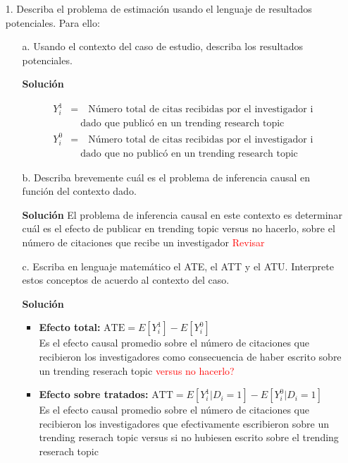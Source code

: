 \documentclass[a4paper, answers, addpoints, 11pt]{exam}
\begin{document}
\bigskip
\begin{itemize}
    \item[1.] Describa el problema de estimación usando el lenguaje de resultados potenciales. Para ello:  

    \begin{itemize}
        \item[a.] Usando el contexto del caso de estudio, describa los resultados potenciales.
        \begin{mdframed}
        \textbf{Solución}
      
    \begin{align*}
    Y_i^1 &= \quad \text{Número total de citas recibidas por el investigador i} \\
          &\quad \text{dado que publicó en un trending research topic} \\
    Y_i^0 &= \quad \text{Número total de citas recibidas por el investigador i} \\
          &\quad \text{dado que no publicó en un trending research topic}
\end{align*}


        \end{mdframed}
        \item[b.] Describa brevemente cuál es el problema de inferencia causal en función del contexto dado.  
\begin{mdframed}
\textbf{Solución}
El problema de inferencia causal en este contexto es determinar cuál es el efecto de publicar en trending topic versus no hacerlo, sobre el número de citaciones que recibe un investigador \textcolor{red}{Revisar}
        \end{mdframed}
        \item[c.] Escriba en lenguaje matemático el ATE, el ATT y el ATU. Interprete estos conceptos de acuerdo al contexto del caso.
        \begin{mdframed}
        \textbf{Solución}
        \begin{itemize}
    \item \textbf{Efecto total:} \( \text{ATE} = E[Y_i^1] - E[Y_i^0] \) \\
    Es el efecto causal promedio sobre el número de citaciones que recibieron los investigadores como consecuencia de haber escrito sobre un trending reserach topic \textcolor{red}{versus no hacerlo?}
    \item \textbf{Efecto sobre tratados:} \( \text{ATT} = E[Y_i^1 | D_i = 1] - E[Y_i^0 | D_i = 1] \)\\
     Es el efecto causal promedio sobre el número de citaciones que recibieron los investigadores que efectivamente escribieron sobre un trending reserach topic versus  si no  hubiesen escrito sobre el trending reserach topic 
    

\end{itemize}
\end{mdframed}
\end{itemize}
\end{itemize}
\end{document}
